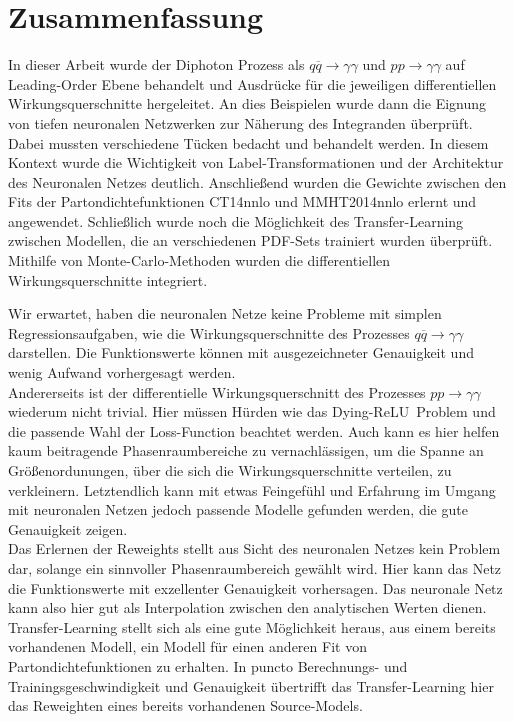 \section{Zusammenfassung}
In dieser Arbeit wurde der Diphoton Prozess als $q\overline{q} \rightarrow \gamma \gamma$ und $pp \rightarrow \gamma \gamma$ auf Leading-Order Ebene behandelt und Ausdrücke für die jeweiligen differentiellen Wirkungsquerschnitte hergeleitet. An dies Beispielen wurde dann die Eignung von tiefen neuronalen Netzwerken zur Näherung des Integranden überprüft. Dabei mussten verschiedene Tücken bedacht und behandelt werden. In diesem Kontext wurde die Wichtigkeit von Label-Transformationen und der Architektur des Neuronalen Netzes deutlich. Anschließend wurden die Gewichte zwischen den Fits der Partondichtefunktionen CT14nnlo und MMHT2014nnlo erlernt und angewendet. Schließlich wurde noch die Möglichkeit des Transfer-Learning zwischen Modellen, die an verschiedenen PDF-Sets trainiert wurden überprüft. Mithilfe von Monte-Carlo-Methoden wurden die differentiellen Wirkungsquerschnitte integriert.

Wir erwartet, haben die neuronalen Netze keine Probleme mit simplen Regressionsaufgaben, wie die Wirkungsquerschnitte des Prozesses $q\overline{q} \rightarrow \gamma \gamma$ darstellen. Die Funktionswerte können mit ausgezeichneter Genauigkeit und wenig Aufwand vorhergesagt werden.\\
Andererseits ist der differentielle Wirkungsquerschnitt des Prozesses $pp \rightarrow \gamma \gamma$ wiederum nicht trivial. Hier müssen Hürden wie das \glqq Dying-ReLU\grqq~Problem und die passende Wahl der Loss-Function beachtet werden. Auch kann es hier helfen kaum beitragende Phasenraumbereiche zu vernachlässigen, um die Spanne an Größenordunungen, über die sich die Wirkungsquerschnitte verteilen, zu verkleinern. Letztendlich kann mit etwas Feingefühl und Erfahrung im Umgang mit neuronalen Netzen jedoch passende Modelle gefunden werden, die gute Genauigkeit zeigen.\\
Das Erlernen der Reweights stellt aus Sicht des neuronalen Netzes kein Problem dar, solange ein sinnvoller Phasenraumbereich gewählt wird. Hier kann das Netz die Funktionswerte mit exzellenter Genauigkeit vorhersagen. Das neuronale Netz kann also hier gut als Interpolation zwischen den analytischen Werten dienen. \\
Transfer-Learning stellt sich als eine gute Möglichkeit heraus, aus einem bereits vorhandenen Modell, ein Modell für einen anderen Fit von Partondichtefunktionen zu erhalten. In puncto Berechnungs- und Trainingsgeschwindigkeit und Genauigkeit übertrifft das Transfer-Learning hier das Reweighten eines bereits vorhandenen Source-Models.

